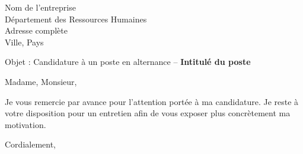 \documentclass[12pt]{letter}
\begin{document}
\begin{letter}{Nom de l'entreprise \\ Département des Ressources Humaines \\ Adresse complète \\ Ville, Pays}

\vspace{-0.7cm}

\opening{Objet : Candidature à un poste en alternance – \textbf{Intitulé du poste}}

Madame, Monsieur,

\lipsum[1] %

\lipsum[2] %

\lipsum[3] %


Je vous remercie par avance pour l’attention portée à ma candidature. Je reste à votre disposition pour un entretien afin de vous exposer plus concrètement ma motivation.

\closing{Cordialement,}

\vspace{1cm}
\signature{Prénom NOM}

\end{letter}
\end{document}
